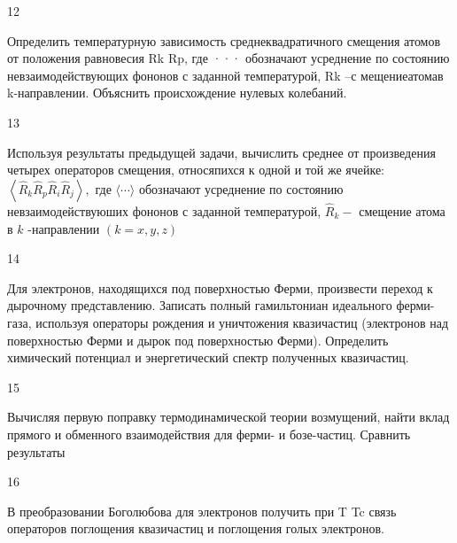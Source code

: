 \documentclass[a4paper,12pt]{article} %
\begin{document}
\begin{task}

12

Определить температурную зависимость среднеквадратичного смещения атомов от положения равновесия Rk Rp, где ··· обозначают усреднение по состоянию невзаимодействующих фононов с заданной температурой,  Rk –с мещениеатомав k-направлении. Объяснить происхождение нулевых колебаний.



\end{task}


\begin{task}

13

Используя результаты предыдущей задачи, вычислить среднее от произведения четырех операторов смещения, относяпихся к одной и той же ячейке: $\left\langle\hat{R}_{k} \hat{R}_{p} \hat{R}_{i} \hat{R}_{j}\right\rangle,$ где $\langle\cdots\rangle$ обозначают усреднение по состоянию невзаимодействуюших фононов с заданной температурой, $\hat{R}_{k}-$ смещение атома в $k$ -направлении $(k=x, y, z)$



\end{task}


\begin{task}

14

Для электронов, находящихся под поверхностью Ферми, произвести переход к дырочному представлению. Записать полный гамильтониан идеального ферми-газа, используя операторы рождения и уничтожения квазичастиц (электронов над поверхностью Ферми и дырок под поверхностью Ферми). Определить химический потенциал и энергетический спектр полученных квазичастиц. 



\end{task}


\begin{task}

15

Вычисляя первую поправку термодинамической теории возмущений, найти вклад прямого и обменного взаимодействия для ферми- и бозе-частиц. Сравнить результаты


\end{task}


\begin{task}

16

В преобразовании Боголюбова для электронов получить при T  Tc связь операторов поглощения квазичастиц и поглощения голых электронов.


\end{task}
\end{document}
